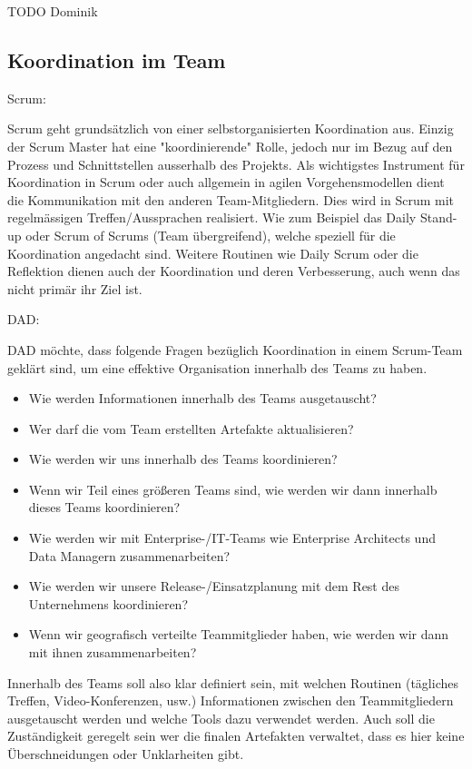 TODO Dominik



\subsection{Koordination im Team}



{\Large Scrum:} \cite{planningReleaseScrum} \medskip

Scrum geht grundsätzlich von einer selbstorganisierten Koordination aus. Einzig der Scrum Master hat eine "koordinierende" Rolle, jedoch nur im Bezug auf den Prozess und Schnittstellen ausserhalb des Projekts.
Als wichtigstes Instrument für Koordination in Scrum oder auch allgemein in agilen Vorgehensmodellen dient die Kommunikation mit den anderen Team-Mitgliedern. Dies wird in Scrum mit regelmässigen Treffen/Aussprachen realisiert. Wie zum Beispiel das Daily Stand-up oder Scrum of Scrums (Team übergreifend), welche speziell für die Koordination angedacht sind. Weitere Routinen wie Daily Scrum oder die Reflektion dienen auch der Koordination und deren Verbesserung, auch wenn das nicht primär ihr Ziel ist.
\bigskip 

{\Large DAD:} \cite{planningReleaseDad} \medskip

DAD möchte, dass folgende Fragen bezüglich Koordination in einem Scrum-Team geklärt sind, um eine effektive Organisation innerhalb des Teams zu haben.
\begin{itemize}
	\item 	Wie werden Informationen innerhalb des Teams ausgetauscht?
	\item 	Wer darf die vom Team erstellten Artefakte aktualisieren? 
	\item 	Wie werden wir uns innerhalb des Teams koordinieren?
	\item 	Wenn wir Teil eines größeren Teams sind, wie werden wir dann innerhalb dieses Teams koordinieren?
	\item 	Wie werden wir mit Enterprise-/IT-Teams wie Enterprise Architects und Data Managern zusammenarbeiten?
	\item 	Wie werden wir unsere Release-/Einsatzplanung mit dem Rest des Unternehmens koordinieren?
	\item 	Wenn wir geografisch verteilte Teammitglieder haben, wie werden wir dann mit ihnen zusammenarbeiten?
\end{itemize}
Innerhalb des Teams soll also klar definiert sein, mit welchen Routinen (tägliches Treffen, Video-Konferenzen, usw.) Informationen zwischen den Teammitgliedern ausgetauscht werden und welche Tools dazu verwendet werden. Auch soll die Zuständigkeit geregelt sein wer die finalen Artefakten verwaltet, dass es hier keine Überschneidungen oder Unklarheiten gibt.
\medskip

